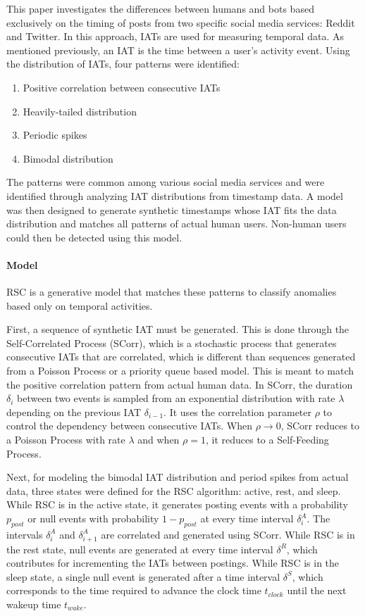 \documentclass[11pt, oneside]{article}   	%
\begin{document}
\quad This paper investigates the differences between humans and bots based exclusively on the timing of posts from two specific social media services: Reddit and Twitter. In this approach,\cite{rsc}
IATs are used for measuring temporal data. As mentioned previously, an IAT is the time between a user's activity event.
Using the distribution of IATs, four patterns were identified:
\begin{enumerate}
	\item Positive correlation between consecutive IATs
	\item Heavily-tailed distribution
	\item Periodic spikes
	\item Bimodal distribution
\end{enumerate}
\quad The patterns were common among various social media services and were identified through analyzing IAT distributions from timestamp data.
A model was then designed to generate synthetic timestamps whose IAT fits the data distribution and matches all patterns of actual human users.
Non-human users could then be detected using this model.

\paragraph*{Model}
\quad

\quad RSC is a generative model that matches these patterns to classify anomalies based only on temporal activities.

\quad First, a sequence of synthetic IAT must be generated.
This is done through the Self-Correlated Process (SCorr), which is a stochastic process that generates consecutive IATs that are correlated, which is different than sequences generated from a Poisson Process or a priority queue based model.
This is meant to match the positive correlation pattern from actual human data.
In SCorr, the duration $\delta_i$ between two events is sampled from an exponential distribution with rate $\lambda$ depending on the previous IAT $\delta_{i-1}$. It uses the correlation parameter $\rho$ to control the dependency between consecutive IATs. When $\rho \rightarrow 0$, SCorr reduces to a Poisson Process with rate $\lambda$ and when $\rho = 1$, it reduces to a Self-Feeding Process.

\quad Next, for modeling the bimodal IAT distribution and period spikes from actual data, three states were defined for the RSC algorithm: active, rest, and sleep.
While RSC is in the active state, it generates posting events with a probability $p_{post}$ or null events with probability $1-p_{post}$ at every time interval $\delta_i^A$.
The intervals $\delta_i^A$ and $\delta_{i+1}^A$ are correlated and generated using SCorr.
While RSC is in the rest state, null events are generated at every time interval $\delta^R$, which contributes for incrementing the IATs between postings.
While RSC is in the sleep state, a single null event is generated after a time interval $\delta^S$, which corresponds to the time required to advance the clock time $t_{clock}$ until the next wakeup time $t_{wake}$.
\end{document}
